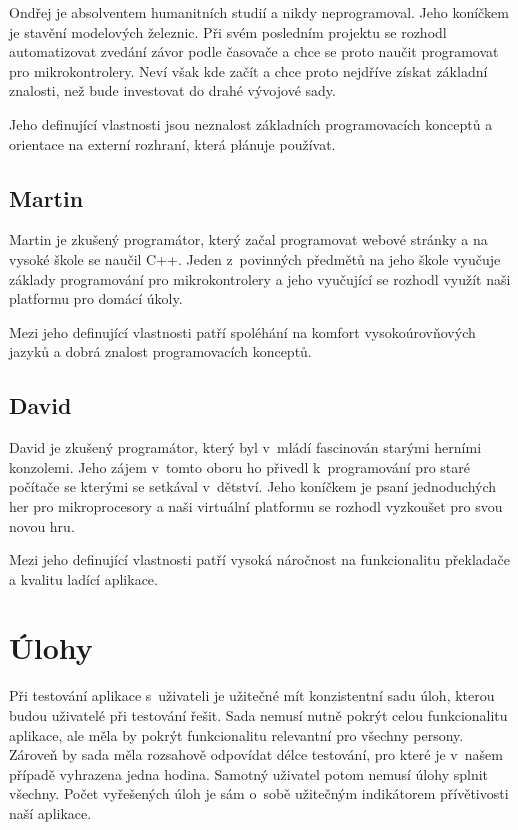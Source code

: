 Ondřej je absolventem humanitních studií a nikdy neprogramoval. Jeho ko\-níč\-kem je stavění modelových železnic. Při svém posledním projektu se rozhodl automatizovat zvedání závor podle časovače a chce se proto naučit programovat pro mikrokontrolery. Neví však kde začít a chce proto nejdříve získat základní znalosti, než bude investovat do drahé vývojové sady.

Jeho definující vlastnosti jsou neznalost základních programovacích konceptů a orientace na externí rozhraní, která plánuje používat.

\subsection{Martin}
\label{persona:b}

Martin je zkušený programátor, který začal programovat webové stránky a na vysoké škole se naučil C++. Jeden z~povinných předmětů na jeho škole vyučuje základy programování pro mikrokontrolery a jeho vyučující se rozhodl využít naši platformu pro domácí úkoly.

Mezi jeho definující vlastnosti patří spoléhání na komfort vysokoúrovňových jazyků a dobrá znalost programovacích konceptů.

\subsection{David}
\label{persona:c}

David je zkušený programátor, který byl v~mládí fascinován starými herními konzolemi. Jeho zájem v~tomto oboru ho přivedl k~programování pro staré počítače se kterými se setkával v~dětství. Jeho koníčkem je psaní jednoduchých her pro mikroprocesory a naši virtuální platformu se rozhodl vyzkoušet pro svou novou hru.

Mezi jeho definující vlastnosti patří vysoká náročnost na funkcionalitu překladače a kvalitu ladící aplikace.

\section{Úlohy}

Při testování aplikace s~uživateli je užitečné mít konzistentní sadu úloh, kterou budou uživatelé při testování řešit. Sada nemusí nutně pokrýt celou funkcionalitu aplikace, ale měla by pokrýt funkcionalitu relevantní pro všechny persony. Zároveň by sada měla rozsahově odpovídat délce testování, pro které je v~našem případě vyhrazena jedna hodina. Samotný uživatel potom nemusí úlohy splnit všechny. Počet vyřešených úloh je sám o~sobě užitečným indikátorem přívětivosti naší aplikace.

